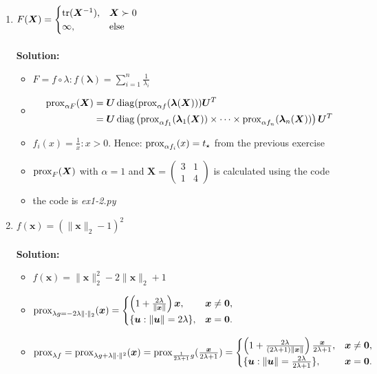\begin{enumerate}
    \item $F(\bm X)=\begin{cases}
        \operatorname{tr}(\bm X^{-1}), & \bm X \succ 0\\
        \infty, & \text{else}
    \end{cases}$\\\\
    \textbf{Solution:}
    \begin{itemize}
        \item $F = f \circ \lambda : f(\bm \lambda)=\sum_{i=1}^n{\frac{1}{\lambda_i}}$
        \item 
        \begin{align*}
            \operatorname{prox}_{\alpha F}(\bm X) &= \bm U \operatorname{diag}(\operatorname{prox}_{\alpha f}(\bm \lambda(\bm X))) \bm U^T \\
            & = \bm U \operatorname{diag} \left(\operatorname{prox}_{\alpha f_1}(\bm \lambda_1(\bm X)) \times \dots \times \operatorname{prox}_{\alpha f_n}(\bm \lambda_n(\bm X))\right) \bm U^T
        \end{align*}
        \item $f_i(x)=\frac{1}{x}: x > 0$. Hence: $\operatorname{prox}_{\alpha f_i}(x)=t_\star$ from the previous exercise
        \item $\operatorname{prox}_{F}(\bm X)$ with $\alpha=1$ and 
        $\bm X=\begin{pmatrix}
            3 & 1\\
            1 & 4
        \end{pmatrix}$ is calculated using the code
        \item the code is \emph{ex1-2.py}
    \end{itemize}

    \item $f(\bm x) = (\|\bm x\|_2 - 1)^2$\\\\
    \textbf{Solution:}
    \begin{itemize}
        \item $f(\bm x)=\|\bm x\|_2^2 - 2\|\bm x\|_2 + 1$
        \item $\operatorname{prox}_{\lambda g=-2\lambda\|\cdot\|_2}(\bm x)=
        \begin{cases}
            \left(1+\frac{2\lambda}{\|\bm x\|}\right) \bm x, & \bm x \neq \bm 0,\\
            \{\bm u: \|\bm u\| = 2\lambda\}, & \bm x = \bm 0.
        \end{cases}$
        \item $\operatorname{prox}_{\lambda f} = \operatorname{prox}_{\lambda g+\lambda\|\cdot\|^2}(\bm x) = \operatorname{prox}_{\frac{1}{2\lambda+1}g}(\frac{\bm x}{2\lambda+1})=\begin{cases}
            \left(1+\frac{2\lambda}{(2\lambda+1)\|\bm x\|}\right) \frac{\bm x}{2\lambda+1}, & \bm x \neq \bm 0,\\
            \{\bm u: \|\bm u\| = \frac{2\lambda}{2\lambda+1}\}, & \bm x = \bm 0.
        \end{cases}$
    \end{itemize} 
    
    
\end{enumerate}